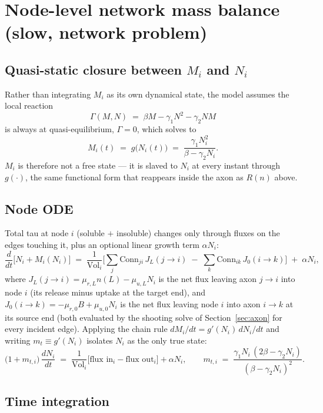 ﻿\documentclass[11pt]{article}
\begin{document}
\section{Node-level network mass balance (slow, network problem)}
\label{sec:node}

\subsection{Quasi-static closure between $M_i$ and $N_i$}

Rather than integrating $M_i$ as its own dynamical state, the model assumes
the local reaction
\[
  \Gamma(M,N) \;=\; \beta M - \gamma_1 N^2 - \gamma_2 N M
\]
is always at quasi-equilibrium, $\Gamma=0$, which solves to
\[
  M_i(t) \;=\; g\big(N_i(t)\big) \;=\; \frac{\gamma_1 N_i^2}{\beta - \gamma_2 N_i}.
\]
$M_i$ is therefore not a free state --- it is slaved to $N_i$ at every instant
through $g(\cdot)$, the same functional form that reappears inside the axon
as $R(n)$ above.

\subsection{Node ODE}

Total tau at node $i$ (soluble $+$ insoluble) changes only through fluxes on
the edges touching it, plus an optional linear growth term $\alpha N_i$:
\[
  \frac{d}{dt}\big[N_i + M_i(N_i)\big]
  \;=\; \frac{1}{\mathrm{Vol}_i}\Big[\sum_j \mathrm{Conn}_{ji}\, J_L(j\!\to\! i) \;-\; \sum_k \mathrm{Conn}_{ik}\, J_0(i\!\to\! k)\Big] \;+\; \alpha N_i ,
\]
where $J_L(j\to i) = \mu_{r,L} n(L) - \mu_{u,L} N_i$ is the net flux leaving axon
$j\to i$ into node $i$ (its release minus uptake at the target end), and
$J_0(i\to k) = -\mu_{r,0} B + \mu_{u,0} N_i$ is the net flux leaving node $i$ into
axon $i\to k$ at its source end (both evaluated by the shooting solve of
Section~\ref{sec:axon} for every incident edge). Applying the chain rule
$dM_i/dt = g'(N_i)\,dN_i/dt$ and writing $m_t \equiv g'(N_i)$ isolates $N_i$
as the only true state:
\[
  \big(1+m_{t,i}\big)\,\frac{dN_i}{dt}
  \;=\; \frac{1}{\mathrm{Vol}_i}\Big[\text{flux in}_i - \text{flux out}_i\Big] + \alpha N_i,
  \qquad
  m_{t,i} \;=\; \frac{\gamma_1 N_i\,(2\beta - \gamma_2 N_i)}{(\beta-\gamma_2 N_i)^2}.
\]

\subsection{Time integration}
\end{document}
